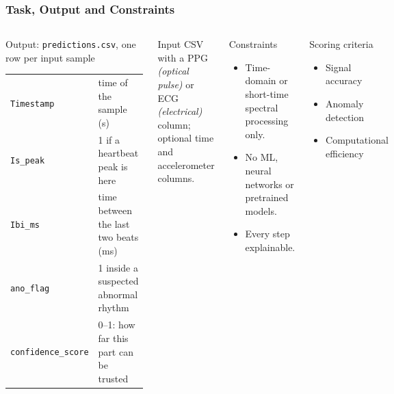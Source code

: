 \documentclass[t,aspectratio=169]{beamer}
\newcommand{\code}[1]{\texttt{#1}}
\newcommand{\plain}[1]{{\color{gray}\textit{(#1)}}}
\begin{document}
\begin{frame}
\frametitle{Task, Output and Constraints}
\begin{columns}[T]
\begin{block}{Output: \code{predictions.csv}, one row per input sample}
\scriptsize
\begin{tabular}{@{}ll@{}}
\toprule
\code{Timestamp} & time of the sample (s)\\
\code{Is\_peak} & 1 if a heartbeat peak is here\\
\code{Ibi\_ms} & time between the last two beats (ms)\\
\code{ano\_flag} & 1 inside a suspected abnormal rhythm\\
\code{confidence\_score} & 0--1: how far this part can be trusted\\
\bottomrule
\end{tabular}
\end{block}
\begin{block}{Input}
\small CSV with a PPG \plain{optical pulse} or ECG \plain{electrical} column; optional time and accelerometer
columns.
\end{block}
\begin{alertblock}{Constraints}
\small
\begin{itemize}
  \item Time-domain or short-time spectral processing only.
  \item No ML, neural networks or pretrained models.
  \item Every step explainable.
\end{itemize}
\end{alertblock}
\begin{exampleblock}{Scoring criteria}
\small
\begin{itemize}
  \item Signal accuracy
  \item Anomaly detection
  \item Computational efficiency
\end{itemize}
\end{exampleblock}
\end{columns}
\end{frame}
\end{document}
